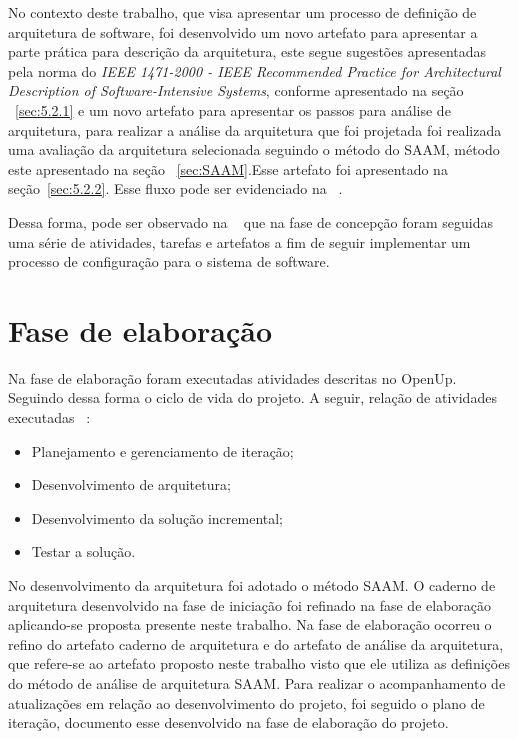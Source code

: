 No contexto deste trabalho, que visa apresentar um processo de definição de arquitetura de software, foi desenvolvido um novo artefato para apresentar a parte prática para descrição da arquitetura, este segue sugestões apresentadas pela norma do \emph{IEEE 1471-2000 - IEEE Recommended Practice for Architectural Description of Software-Intensive Systems}, conforme apresentado na seção ~\ref{sec:5.2.1} e um novo artefato para apresentar os passos para análise de arquitetura, para realizar a análise da arquitetura que foi projetada foi realizada uma avaliação da arquitetura selecionada seguindo o método do \acrfull{SAAM}, método este apresentado na seção ~\ref{sec:SAAM}.Esse artefato foi apresentado na seção~\ref{sec:5.2.2}.
Esse fluxo pode ser evidenciado na ~.

%

%

Dessa forma, pode ser observado na ~ que na fase de concepção foram seguidas uma série de atividades, tarefas e artefatos a fim de seguir implementar um processo de configuração para o sistema de software.

\section{Fase de elaboração}
Na fase de elaboração foram executadas atividades descritas no \acrfull{OpenUp}. Seguindo dessa forma o ciclo de vida do projeto. A seguir, relação de atividades executadas ~\cite{openup}:

\begin{itemize}
    \item Planejamento e gerenciamento de iteração;
    \item Desenvolvimento de arquitetura;
    \item Desenvolvimento da solução incremental;
    \item Testar a solução.
\end{itemize}

No desenvolvimento da arquitetura foi adotado o método \acrfull{SAAM}. O caderno de arquitetura desenvolvido na fase de iniciação foi refinado na fase de elaboração aplicando-se proposta presente neste trabalho. Na fase de elaboração ocorreu o refino do artefato caderno de arquitetura e do artefato de análise da arquitetura, que refere-se ao artefato proposto neste trabalho visto que ele utiliza as definições do método de análise de arquitetura \acrfull{SAAM}. Para realizar o acompanhamento de atualizações em relação ao desenvolvimento do projeto, foi seguido o plano de iteração, documento esse desenvolvido na fase de elaboração do projeto.


